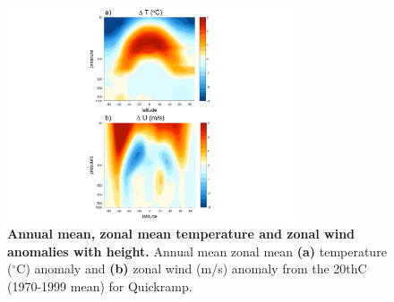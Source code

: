 \documentclass[grl]{AGUTeX}  %
\begin{document}
\begin{article}
\begin{figure}[htbp] %
\centering
 \noindent\includegraphics[width=20pc]{figures/verticalU_T_v20thC2.pdf}  %
\caption{\textbf{Annual mean, zonal mean temperature and zonal wind anomalies with height.} Annual mean zonal mean \textbf{(a)} temperature ($^\circ$C) anomaly and \textbf{(b)} zonal wind (m/s) anomaly from the 20thC (1970-1999 mean) for Quickramp.}
\label{fig:vert}
\end{figure}


\end{article}
\end{document}
